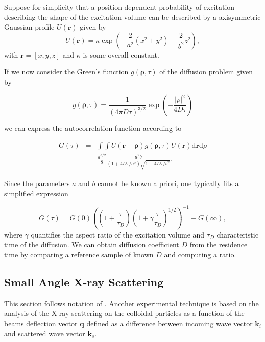 \documentclass{doctoral}
\newcommand{\dd}{\mathrm{d}}
\begin{document}
Suppose for simplicity that a position-dependent probability of excitation describing the shape of the excitation volume can be described by a axisymmetric Gaussian profile $U(\bm{r})$ given by
\begin{equation}
    U(\bm{r}) = \kappa \exp\left( - \frac{2}{a^2} \left( x^2 + y^2 \right) - \frac{2}{b^2} z^2 \right), \label{eqn:excitation_profile}
\end{equation}
with $\bm{r} = [x,y,z]$ and $\kappa$ is some overall constant.

If we now consider the Green's function $g(\bm{\rho},\tau)$ of the diffusion problem given by 

\begin{equation}
    g(\bm{\rho},\tau) = \frac{1}{(4\pi D \tau)^{3/2}} \exp\left( - \frac{|\rho|^2}{4 D \tau}\right)
\end{equation}

we can express the autocorrelation function according to 

\begin{eqnarray}
    G(\tau) & = & \int \int U(\bm{r} + \bm{\rho}) g(\bm{\rho},\tau) U(\bm{r}) \dd \bm{r} \dd \rho \\
            & = & \frac{\pi^{3/2}}{8} \frac{a^2 b}{(1+4 D \tau / a^2)\sqrt{1+4D\tau/b^2}}.
    \label{eqn:fcs_theory}
\end{eqnarray}

Since the parameters $a$ and $b$ cannot be known a priori, one typically fits a simplified expression 

\begin{equation}
    G(\tau) = G(0) \left( \left(1+\frac{\tau}{\tau_D}\right) \left(1 + \gamma \frac{\tau}{\tau_D}\right)^{1/2} \right)^{-1} + G(\infty), \label{eqn:fcs-autocorrelation}
\end{equation}
where $\gamma$ quantifies the aspect ratio of the excitation volume and $\tau_D$ characteristic time of the diffusion.
We can obtain diffusion coefficient $D$ from the residence time by comparing a reference sample of known $D$ and computing a ratio.

\subsection{Small Angle X-ray Scattering}
\label{sec:SAXS}

This section follows notation of \textcite{Hermann_2008}.
Another experimental technique is based on the analysis of the X-ray scattering on the colloidal particles as a function of the beams deflection vector $\bm{q}$ defined as a difference between incoming wave vector $\bm{k}_i$ and scattered wave vector $\bm{k}_s$.
\end{document}
